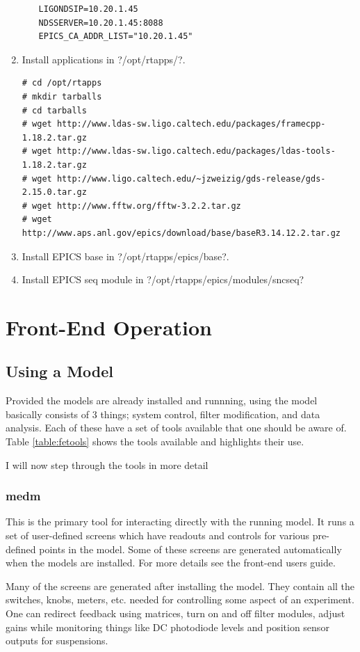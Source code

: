 \begin{enumerate}
\begin{itemize}
\begin{lstlisting}
LIGONDSIP=10.20.1.45
NDSSERVER=10.20.1.45:8088
EPICS_CA_ADDR_LIST="10.20.1.45"
\end{lstlisting}
\end{itemize}
\item Install applications in \lstin?/opt/rtapps/?.
\begin{lstlisting}
# cd /opt/rtapps
# mkdir tarballs
# cd tarballs
# wget http://www.ldas-sw.ligo.caltech.edu/packages/framecpp-1.18.2.tar.gz
# wget http://www.ldas-sw.ligo.caltech.edu/packages/ldas-tools-1.18.2.tar.gz
# wget http://www.ligo.caltech.edu/~jzweizig/gds-release/gds-2.15.0.tar.gz
# wget http://www.fftw.org/fftw-3.2.2.tar.gz
# wget http://www.aps.anl.gov/epics/download/base/baseR3.14.12.2.tar.gz
\end{lstlisting}
\item Install EPICS base in \lstin?/opt/rtapps/epics/base?.
\item Install EPICS seq module in \lstin?/opt/rtapps/epics/modules/sncseq?
\end{enumerate}


\section{Front-End Operation}

\subsection{Using a Model}

Provided the models are already installed and runnning, using the model
basically consists of 3 things; system control, filter
modification, and data analysis. Each of these have a set of tools available
that one should be aware of. Table \ref{table:fetools} shows the tools available
and highlights their use.

I will now step through the tools in more detail

\subsubsection{medm}
This is the primary tool for interacting directly with the running model. It
runs a set of user-defined screens which have readouts and controls for various
pre-defined points in the model. Some of these screens are generated
automatically when the models are installed. For more details see
the front-end users guide.

Many of the screens are generated after installing the model. They contain all
the switches, knobs, meters, etc. needed for controlling some aspect of an
experiment. One can redirect feedback using matrices, turn on and off filter
modules, adjust gains while monitoring things like DC photodiode levels and
position sensor outputs for suspensions.

